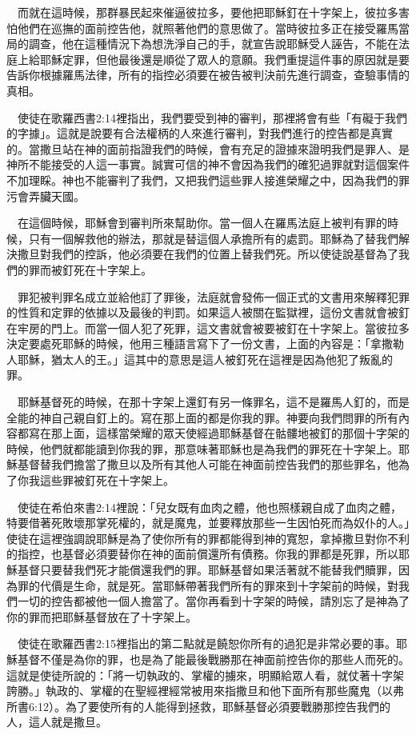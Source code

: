 \documentclass{book}
\begin{document}
　而就在這時候，那群暴民起來催逼彼拉多，要他把耶穌釘在十字架上，彼拉多害怕他們在巡撫的面前控告他，就照著他們的意思做了。當時彼拉多正在接受羅馬當局的調查，他在這種情況下為想洗淨自己的手，就宣告說耶穌受人誣告，不能在法庭上給耶穌定罪，但他最後還是順從了眾人的意願。我們重提這件事的原因就是要告訴你根據羅馬法律，所有的指控必須要在被告被判決前先進行調查，查驗事情的真相。

　使徒在歌羅西書2:14裡指出，我們要受到神的審判，那裡將會有些「有礙于我們的字據」。這就是說要有合法權柄的人來進行審判，對我們進行的控告都是真實的。當撒旦站在神的面前指證我們的時候，會有充足的證據來證明我們是罪人、是神所不能接受的人這一事實。誠實可信的神不會因為我們的確犯過罪就對這個案件不加理睬。神也不能審判了我們，又把我們這些罪人接進榮耀之中，因為我們的罪污會弄臟天國。

　在這個時候，耶穌會到審判所來幫助你。當一個人在羅馬法庭上被判有罪的時候，只有一個解救他的辦法，那就是替這個人承擔所有的處罰。耶穌為了替我們解決撒旦對我們的控訴，他必須要在我們的位置上替我們死。所以使徒說基督為了我們的罪而被釘死在十字架上。

　罪犯被判罪名成立並給他訂了罪後，法庭就會發佈一個正式的文書用來解釋犯罪的性質和定罪的依據以及最後的判罰。如果這人被關在監獄裡，這份文書就會被釘在牢房的門上。而當一個人犯了死罪，這文書就會被要被釘在十字架上。當彼拉多決定要處死耶穌的時候，他用三種語言寫下了一份文書，上面的內容是：「拿撒勒人耶穌，猶太人的王。」這其中的意思是這人被釘死在這裡是因為他犯了叛亂的罪。

　耶穌基督死的時候，在那十字架上還釘有另一條罪名，這不是羅馬人釘的，而是全能的神自己親自釘上的。寫在那上面的都是你我的罪。神要向我們問罪的所有內容都寫在那上面，這樣當榮耀的眾天使經過耶穌基督在骷髏地被釘的那個十字架的時候，他們就都能讀到你我的罪，那意味著耶穌也是為我們的罪死在十字架上。耶穌基督替我們擔當了撒旦以及所有其他人可能在神面前控告我們的那些罪名，他為了你我這些罪被釘死在十字架上。

　使徒在希伯來書2:14裡說：「兒女既有血肉之體，他也照樣親自成了血肉之體，特要借著死敗壞那掌死權的，就是魔鬼，並要釋放那些一生因怕死而為奴仆的人。」使徒在這裡強調說耶穌是為了使你所有的罪都能得到神的寬恕，拿掉撒旦對你不利的指控，也基督必須要替你在神的面前償還所有債務。你我的罪都是死罪，所以耶穌基督只要替我們死才能償還我們的罪。耶穌基督如果活著就不能替我們贖罪，因為罪的代價是生命，就是死。當耶穌帶著我們所有的罪來到十字架前的時候，對我們一切的控告都被他一個人擔當了。當你再看到十字架的時候，請別忘了是神為了你的罪而把耶穌基督放在了十字架上。

　使徒在歌羅西書2:15裡指出的第二點就是饒恕你所有的過犯是非常必要的事。耶穌基督不僅是為你的罪，也是為了能最後戰勝那在神面前控告你的那些人而死的。這就是使徒所說的：「將一切執政的、掌權的擄來，明顯給眾人看，就仗著十字架誇勝。」執政的、掌權的在聖經裡經常被用來指撒旦和他下面所有那些魔鬼（以弗所書6:12）。為了要使所有的人能得到拯救，耶穌基督必須要戰勝那控告我們的人，這人就是撒旦。
\end{document}
